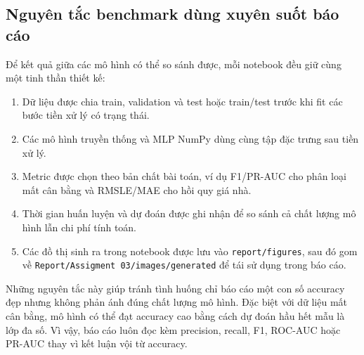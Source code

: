 \documentclass[12pt,a4paper]{report}
\newcommand{\modelpath}[1]{\texttt{#1}}
\begin{document}
\begin{table}[H]
\centering
\caption{Tổng quan các bộ dữ liệu trong Assignment 03}
\label{tab:dataset_overview}
\end{table}

\subsection{Nguyên tắc benchmark dùng xuyên suốt báo cáo}
Để kết quả giữa các mô hình có thể so sánh được, mỗi notebook đều giữ cùng một tinh thần thiết kế:
\begin{enumerate}
    \item Dữ liệu được chia train, validation và test hoặc train/test trước khi fit các bước tiền xử lý có trạng thái.
    \item Các mô hình truyền thống và MLP NumPy dùng cùng tập đặc trưng sau tiền xử lý.
    \item Metric được chọn theo bản chất bài toán, ví dụ F1/PR-AUC cho phân loại mất cân bằng và RMSLE/MAE cho hồi quy giá nhà.
    \item Thời gian huấn luyện và dự đoán được ghi nhận để so sánh cả chất lượng mô hình lẫn chi phí tính toán.
    \item Các đồ thị sinh ra trong notebook được lưu vào \modelpath{report/figures}, sau đó gom về \modelpath{Report/Assigment 03/images/generated} để tái sử dụng trong báo cáo.
\end{enumerate}

Những nguyên tắc này giúp tránh tình huống chỉ báo cáo một con số accuracy đẹp nhưng không phản ánh đúng chất lượng mô hình.
Đặc biệt với dữ liệu mất cân bằng, mô hình có thể đạt accuracy cao bằng cách dự đoán hầu hết mẫu là lớp đa số.
Vì vậy, báo cáo luôn đọc kèm precision, recall, F1, ROC-AUC hoặc PR-AUC thay vì kết luận vội từ accuracy.
\end{document}
